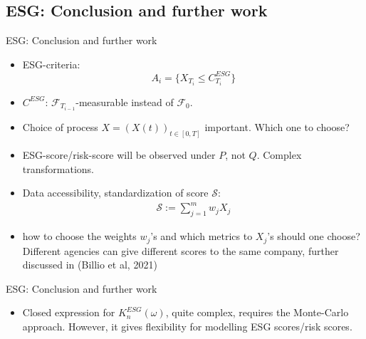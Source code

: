 \documentclass[UKenglish]{beamer}
\newcommand{\F}{\mathcal{F}} %
\begin{document}
\subsection{ESG: Conclusion and further work}
\begin{frame}{ESG: Conclusion and further work}
\begin{itemize}
    \item ESG-criteria: 
    \[
    A_{i} = \{X_{T_{i}} \leq C_{T_{i}}^{ESG}\}
    \]
    \item $C^{ESG}$: $\F_{T_{i-1}}$-measurable instead of $\F_{0}$. 
    \item Choice of process $X = (X(t))_{t\in[0,T]}$ important. Which one to choose? 
    \item ESG-score/risk-score will be observed under $P$, not $Q$. Complex transformations. 
    \item Data accessibility, standardization of score $\mathcal{S}$: 
    \begin{align*}
     \mathcal{S} := \sum_{j=1}^{m}w_{j}X_{j}   
    \end{align*}
    \item how to choose the weights $w_{j}$'s and which metrics to $X_{j}$'s should one choose?
    Different agencies can give different scores to the same company, further discussed in \cite{Billio2021} (Billio et al, 2021)  
\end{itemize}
\end{frame}


\begin{frame}{ESG: Conclusion and further work}
\begin{itemize}
    \item Closed expression for $K_{n}^{ESG}(\omega)$, quite complex, requires the Monte-Carlo approach. However, it gives flexibility for modelling ESG scores/risk scores. 
\end{itemize}
\end{frame}

\end{document}
